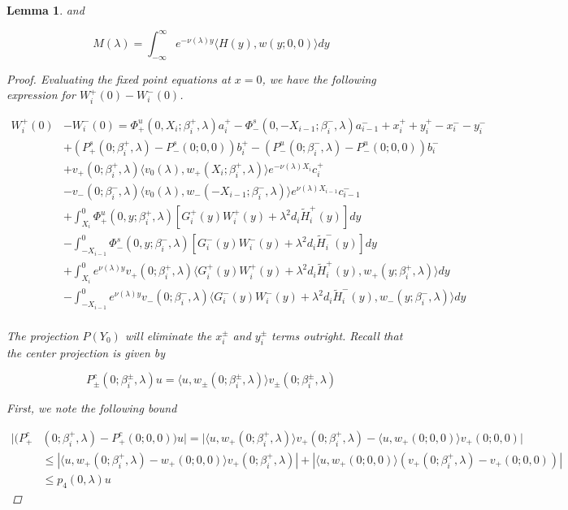 \documentclass[12pt]{article}
\newtheorem{lemma}{Lemma}
\begin{document}
\begin{lemma}
and

\begin{equation}
M(\lambda) = \int_{-\infty}^\infty e^{-\nu(\lambda)y} \langle H(y), w(y; 0, 0) \rangle dy
\end{equation}

\begin{proof}

Evaluating the fixed point equations at $x = 0$, we have the following expression for $W_i^+(0) - W_i^-(0)$.

\begin{align*}
W_i^+(0) &- W_i^-(0) = \Phi^u_+(0, X_i; \beta_i^+, \lambda)a_i^+ - \Phi^s_-(0, -X_{i-1}; \beta_i^-, \lambda)a_{i-1}^- + x_i^+ + y_i^+ - x_i^- - y_i^- \\
&+ (P^s_+(0; \beta_i^+, \lambda) - P^s_-(0; 0, 0))b_i^+ - (P^u_-(0; \beta_i^-, \lambda) - P^u_-(0; 0, 0))b_i^- \\
&+ v_+(0; \beta_i^+, \lambda) \langle v_0(\lambda), w_+(X_i; \beta_i^+, \lambda) \rangle e^{-\nu(\lambda)X_i} c_i^+ \\
&- v_-(0; \beta_i^-, \lambda) \langle v_0(\lambda), w_-(-X_{i-1}; \beta_i^-, \lambda) \rangle e^{\nu(\lambda)X_{i-1}} c_{i-1}^- \\
&+ \int_{X_i}^0 \Phi^u_+(0, y; \beta_i^+, \lambda) [ G_i^+(y)W_i^+(y) + \lambda^2 d_i \tilde{H}_i^+(y) ] dy \\
&- \int_{-X_{i-1}}^0 \Phi^s_-(0, y; \beta_i^-, \lambda) [ G_i^-(y)W_i^-(y) + \lambda^2 d_i \tilde{H}_i^-(y) ] dy \\
&+ \int_{X_i}^0 e^{\nu(\lambda)y} v_+(0; \beta_i^+, \lambda) \langle G_i^+(y)W_i^+(y) + \lambda^2 d_i \tilde{H}_i^+(y), w_+(y; \beta_i^+, \lambda) \rangle dy \\
&- \int_{-X_{i-1}}^0
e^{\nu(\lambda)y} v_-(0; \beta_i^-, \lambda) \langle G_i^-(y)W_i^-(y) + \lambda^2 d_i \tilde{H}_i^-(y), w_-(y; \beta_i^-, \lambda) \rangle dy \\
\end{align*}

The projection $P(Y_0)$ will eliminate the $x_i^\pm$ and $y_i^\pm$ terms outright. Recall that the center projection is given by

\[
P^c_\pm(0; \beta_i^\pm, \lambda)u = \langle u, w_\pm(0; \beta_i^\pm, \lambda) \rangle v_\pm(0; \beta_i^\pm, \lambda)
\]

First, we note the following bound

\begin{align*}
|(P^c_+&(0; \beta_i^+, \lambda) - P^c_+(0; 0, 0) )u| = |\langle u, w_+(0; \beta_i^+, \lambda) \rangle v_+(0; \beta_i^+, \lambda) - \langle u, w_+(0; 0, 0) \rangle v_+(0; 0, 0)| \\
&\leq |\langle u, w_+(0; \beta_i^+, \lambda) - w_+(0; 0, 0) \rangle v_+(0; \beta_i^+, \lambda)| + | \langle u, w_+(0; 0, 0) \rangle( v_+(0; \beta_i^+, \lambda) - v_+(0; 0, 0))| \\
&\leq p_4(0, \lambda) u
\end{align*}


\end{proof}
\end{lemma}
\end{document}

